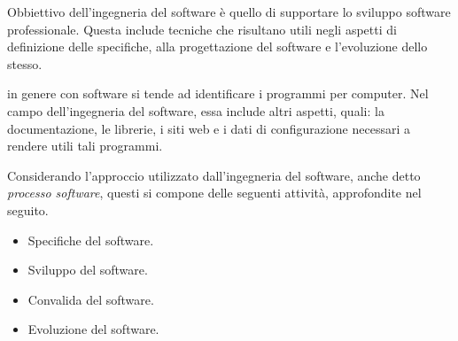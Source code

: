 \documentclass{subfiles}
\begin{document}
Obbiettivo dell'ingegneria del software è quello di supportare lo sviluppo software professionale.
Questa include tecniche che risultano utili negli aspetti di definizione delle specifiche, alla progettazione del software e l'evoluzione dello stesso.

\begin{Remark*}
    in genere con software si tende ad identificare i programmi per computer. Nel campo dell'ingegneria del software, essa include altri aspetti, quali:
    la documentazione, le librerie, i siti web e i dati di configurazione necessari a rendere utili tali programmi.
\end{Remark*}

\noindent Considerando l'approccio utilizzato dall'ingegneria del software, anche detto \emph{processo software}, questi si compone delle seguenti attività,
approfondite nel seguito.
\begin{itemize}
    \item Specifiche del software.
    \item Sviluppo del software.
    \item Convalida del software.
    \item Evoluzione del software.
\end{itemize}
\end{document}

